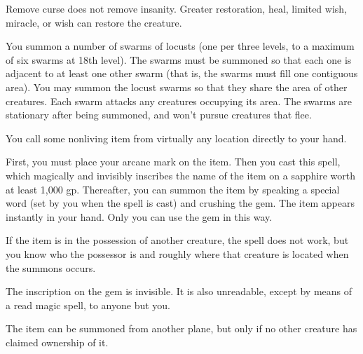 \begin{multicols}{2}
\begin{small}
\smallskip\noindent Remove curse does not remove insanity. Greater restoration, heal, limited wish, miracle, or wish can restore the creature.

\noindent You summon a number of swarms of locusts (one per three levels, to a maximum of six swarms at 18th level). The swarms must be summoned so that each one is adjacent to at least one other swarm (that is, the swarms must fill one contiguous area). You may summon the locust swarms so that they share the area of other creatures. Each swarm attacks any creatures occupying its area. The swarms are stationary after being summoned, and won't pursue creatures that flee.

\noindent You call some nonliving item from virtually any location directly to your hand.

\smallskip\noindent First, you must place your arcane mark on the item. Then you cast this spell, which magically and invisibly inscribes the name of the item on a sapphire worth at least 1,000 gp. Thereafter, you can summon the item by speaking a special word (set by you when the spell is cast) and crushing the gem. The item appears instantly in your hand. Only you can use the gem in this way.

\smallskip\noindent If the item is in the possession of another creature, the spell does not work, but you know who the possessor is and roughly where that creature is located when the summons occurs.

\smallskip\noindent The inscription on the gem is invisible. It is also unreadable, except by means of a read magic spell, to anyone but you.

\smallskip\noindent The item can be summoned from another plane, but only if no other creature has claimed ownership of it.


\end{small}
\end{multicols}
